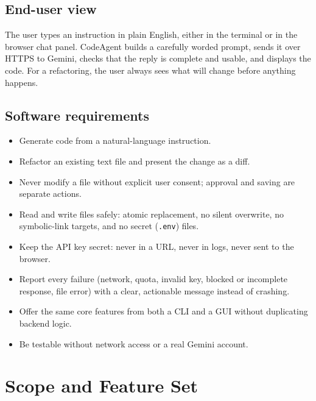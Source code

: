 \documentclass[12pt,a4paper,oneside]{book}
\begin{document}
\subsection*{End-user view}
The user types an instruction in plain English, either in the terminal or in
the browser chat panel. CodeAgent builds a carefully worded prompt, sends it
over HTTPS to Gemini, checks that the reply is complete and usable, and
displays the code. For a refactoring, the user always sees what will change
before anything happens.

\subsection*{Software requirements}
\begin{itemize}
  \item[\textbf{R1}] Generate code from a natural-language instruction.
  \item[\textbf{R2}] Refactor an existing text file and present the change as
    a diff.
  \item[\textbf{R3}] Never modify a file without explicit user consent;
    approval and saving are separate actions.
  \item[\textbf{R4}] Read and write files safely: atomic replacement, no
    silent overwrite, no symbolic-link targets, and no secret
    (\texttt{.env}) files.
  \item[\textbf{R5}] Keep the API key secret: never in a URL, never in logs,
    never sent to the browser.
  \item[\textbf{R6}] Report every failure (network, quota, invalid key,
    blocked or incomplete response, file error) with a clear, actionable
    message instead of crashing.
  \item[\textbf{R7}] Offer the same core features from both a CLI and a GUI
    without duplicating backend logic.
  \item[\textbf{R8}] Be testable without network access or a real Gemini
    account.
\end{itemize}

\section{Scope and Feature Set}
\end{document}
